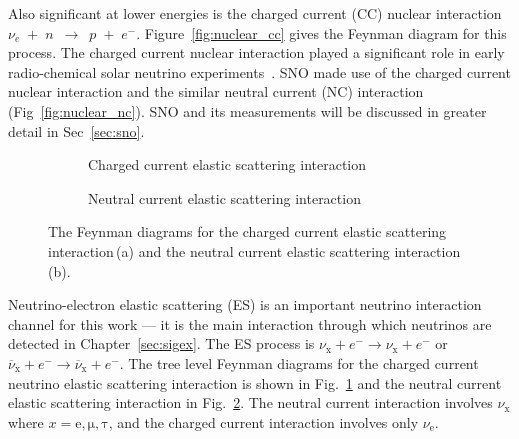 Also significant at lower energies is the charged current (CC) nuclear interaction
$\nu_{e}$~$+$~$n$~$\rightarrow$~$p$~$+$~$e^{-}$.
Figure~\ref{fig:nuclear_cc} gives the Feynman diagram for this process.
The charged current nuclear interaction played a significant role in early
radio-chemical solar neutrino experiments~\citep{homestake, sage, gallex, gno}.
SNO made use of the charged current nuclear interaction and the similar neutral
current (NC) interaction (Fig~\ref{fig:nuclear_nc}).
SNO and its measurements will be discussed in greater detail in Sec~\ref{sec:sno}.

\label{sec:esxsec}
\begin{figure}
\centering
\begin{subfigure}[t]{0.48\textwidth}
\centering
\begin{feynman}
\end{feynman}
\caption[Charged Current Elastic Scattering Feynman Diagram]{
Charged current elastic scattering interaction}
\label{fig:ES_CC}
\end{subfigure}
\hfill
\begin{subfigure}[t]{0.48\textwidth}
\centering
\begin{feynman}
\end{feynman}
\caption[Neutral Current Elastic Scattering Feynman Diagram]{
Neutral current elastic scattering interaction}
\label{fig:ES_NC}
\end{subfigure}
\label{fig:feynman_es}
\caption[Elastic Scattering Feynman Diagrams]{The Feynman diagrams for the
    charged current elastic scattering interaction\,(a) and the neutral
    current elastic scattering interaction\,(b).}
\end{figure}

Neutrino-electron elastic scattering (ES) is an important neutrino interaction
channel for this work --- it is the main interaction through which neutrinos are
detected in Chapter~\ref{sec:sigex}.
The ES process is $\nu_{\mathrm{x}} + e^{-} \rightarrow \nu_{\mathrm{x}} +e^{-}$
or $\overline{\nu}_{\mathrm{x}} + e^{-} \rightarrow \overline{\nu}_{\mathrm{x}} +e^{-}$.
The tree level Feynman diagrams for the charged current neutrino elastic scattering
interaction is shown in Fig.~\ref{fig:ES_CC} and the neutral current elastic
scattering interaction in Fig.~\ref{fig:ES_NC}.
The neutral current interaction involves $\nu_{\mathrm{x}}$ where $x=\mathrm{e, \mu, \tau}$,
and the charged current interaction involves only $\nu_{\mathrm{e}}$.

